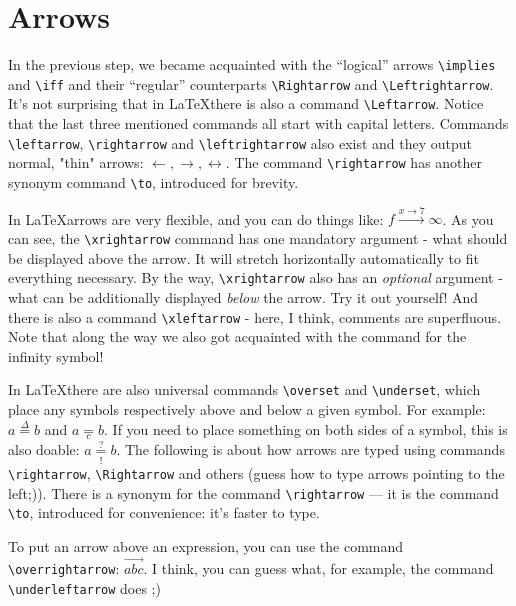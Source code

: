 \section{Arrows}
\par In the previous step, we became acquainted with the ``logical'' arrows \verb"\implies" and \verb"\iff" and their ``regular'' counterparts \verb"\Rightarrow" and \verb"\Leftrightarrow". It's not surprising that in \LaTeX there is also a command \verb"\Leftarrow". Notice that the last three mentioned commands all start with capital letters. Commands \verb"\leftarrow", \verb"\rightarrow" and \verb"\leftrightarrow" also exist and they output normal, "thin" arrows: \(\leftarrow,\rightarrow,\leftrightarrow\). The command \verb"\rightarrow" has another synonym command \verb"\to", introduced for brevity.

\par In \LaTeX arrows are very flexible, and you can do things like: \( f\xrightarrow{x\rightarrow 7}\infty \). As you can see, the \verb"\xrightarrow" command has one mandatory argument - what should be displayed above the arrow. It will stretch horizontally automatically to fit everything necessary. By the way, \verb"\xrightarrow" also has an \emph{optional} argument - what can be additionally displayed \emph{below} the arrow. Try it out yourself! And there is also a command \verb"\xleftarrow" - here, I think, comments are superfluous. Note that along the way we also got acquainted with the command for the infinity symbol!
\par In \LaTeX there are also universal commands \verb"\overset" and \verb"\underset", which place any symbols respectively above and below a given symbol. For example: \( a \overset{\Delta}{=} b \) and \( a \underset{c}{=} b \). If you need to place something on both sides of a symbol, this is also doable: \( a \underset{!}{\overset{?}{=}} b \).
The following is about how arrows are typed using commands \verb"\rightarrow", \verb"\Rightarrow" and others (guess how to type arrows pointing to the left;)). There is a synonym for the command \verb"\rightarrow" --- it is the command \verb"\to", introduced for convenience: it's faster to type.

\par To put an arrow above an expression, you can use the command \verb"\overrightarrow": \(\overrightarrow{abc}\). I think, you can guess what, for example, the command \verb"\underleftarrow" does ;)

